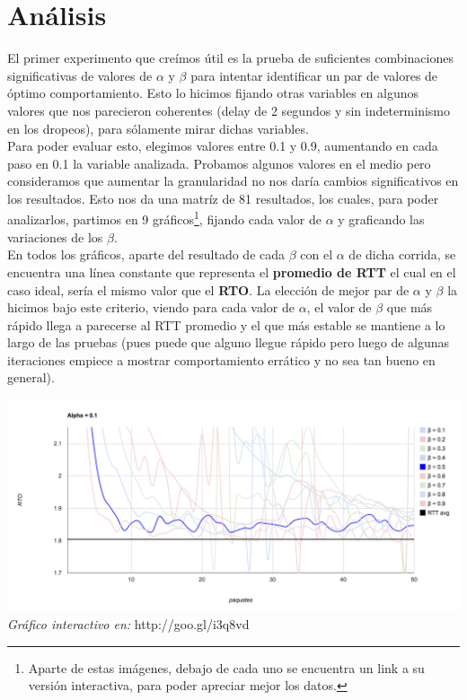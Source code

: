 \section{Análisis}

El primer experimento que creímos útil es la prueba de suficientes combinaciones significativas de valores de $\alpha$ y $\beta$ para intentar identificar un par de valores de óptimo comportamiento. Esto lo hicimos fijando otras variables en algunos valores que nos parecieron coherentes (delay de 2 segundos y sin indeterminismo en los dropeos), para sólamente mirar dichas variables.\\

\indent Para poder evaluar esto, elegimos valores entre 0.1 y 0.9, aumentando en cada paso en 0.1 la variable analizada. Probamos algunos valores en el medio pero consideramos que aumentar la granularidad no nos daría cambios significativos en los resultados. Esto nos da una matríz de 81 resultados, los cuales, para poder analizarlos, partimos en 9 gráficos\footnote{Aparte de estas imágenes, debajo de cada uno se encuentra un link a su versión interactiva, para poder apreciar mejor los datos.}, fijando cada valor de $\alpha$ y graficando las variaciones de los $\beta$.\\

\indent En todos los gráficos, aparte del resultado de cada $\beta$ con el $\alpha$ de dicha corrida, se encuentra una línea constante que representa el \textbf{promedio de RTT} el cual en el caso ideal, sería el mismo valor que el \textbf{RTO}. La elección de mejor par de $\alpha$ y $\beta$ la hicimos bajo este criterio, viendo para cada valor de $\alpha$, el valor de $\beta$ que más rápido llega a parecerse al RTT promedio y el que más estable se mantiene a lo largo de las pruebas (pues puede que alguno llegue rápido pero luego de algunas iteraciones empiece a mostrar comportamiento errático y no sea tan bueno en general).

\begin{center}
	\includegraphics[scale=0.35]{graphics/rto_vs_paquetes_a_1.png}
	\textit{Gráfico interactivo en:} http://goo.gl/i3q8vd
\end{center}


